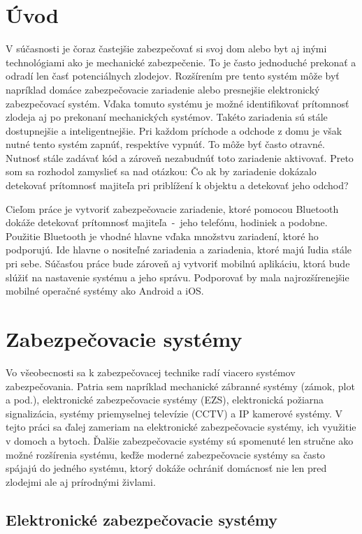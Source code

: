 \chapter{Úvod}

V súčasnosti je čoraz častejšie zabezpečovať si svoj dom alebo byt aj inými technológiami ako je mechanické zabezpečenie. To je často jednoduché prekonať a odradí len časť potenciálnych zlodejov. Rozšírením pre tento systém môže byť napríklad domáce zabezpečovacie zariadenie alebo presnejšie elektronický zabezpečovací systém. Vďaka tomuto systému je možné identifikovať prítomnosť zlodeja aj po prekonaní mechanických systémov. Takéto zariadenia sú stále dostupnejšie a inteligentnejšie. Pri každom príchode a odchode z domu je však nutné tento systém zapnúť, respektíve vypnúť. To môže byť často otravné. Nutnosť stále zadávať kód a zároveň nezabudnúť toto zariadenie aktivovať. Preto som sa rozhodol zamyslieť sa nad otázkou: Čo ak by zariadenie dokázalo detekovať prítomnosť majiteľa pri priblížení k objektu a detekovať jeho odchod?

Cieľom práce je vytvoriť zabezpečovacie zariadenie, ktoré pomocou Bluetooth dokáže detekovať prítomnosť majiteľa~-~jeho telefónu, hodiniek a podobne. Použitie Bluetooth je vhodné hlavne vďaka množstvu zariadení, ktoré ho podporujú. Ide hlavne o nositeľné zariadenia a zariadenia, ktoré majú ľudia stále pri sebe.
Súčasťou práce bude zároveň aj vytvoriť mobilnú aplikáciu, ktorá bude slúžiť na nastavenie systému a jeho správu. Podporovať by mala najrozšírenejšie mobilné operačné systémy ako Android a iOS.

\chapter{Zabezpečovacie systémy}

Vo všeobecnosti sa k zabezpečovacej technike radí viacero systémov zabezpečovania. Patria sem napríklad mechanické zábranné systémy (zámok, plot a pod.), elektronické zabezpečovacie systémy (EZS), elektronická požiarna signalizácia, systémy priemyselnej televízie (CCTV) a IP kamerové systémy. V tejto práci sa ďalej zameriam na elektronické zabezpečovacie systémy, ich využitie v domoch a bytoch. Ďalšie zabezpečovacie systémy sú spomenuté len stručne ako možné rozšírenia systému, keďže moderné zabezpečovacie systémy sa často spájajú do jedného systému, ktorý dokáže ochrániť domácnosť nie len pred zlodejmi ale aj prírodnými živlami.

\section{Elektronické zabezpečovacie systémy}

